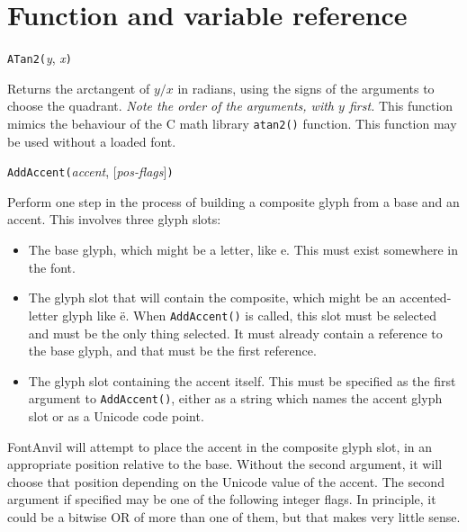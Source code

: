\chapter{Function and variable reference}



\texttt{ATan2(}\textit{y}, \textit{x}\texttt{)}

Returns the arctangent of $y/x$ in radians, using the signs of the arguments
to choose the quadrant.  \emph{Note the order of the arguments, with $y$
first.}  This function mimics the behaviour of the C math library
\texttt{atan2()} function.  This function may be used without a
loaded font.



\texttt{AddAccent(}\textit{accent}, [\textit{pos-flags}]\texttt{)}

Perform one step in the process of building a composite glyph from a base
and an accent.  This involves three glyph slots:
\begin{itemize}
  \item The base glyph, which might be a letter, like e.  This must exist
    somewhere in the font.
  \item The glyph slot that will contain the composite, which might be an
    accented-letter glyph like \"{e}.  When \texttt{AddAccent()} is called,
    this slot must be selected and must be the only thing selected.  It must
    already contain a reference to the base glyph, and that must be the
    first reference.
  \item The glyph slot containing the accent itself.  This must be specified
    as the first argument to \texttt{AddAccent()}, either as a string which
    names the accent glyph slot or as a Unicode code point.
\end{itemize}

FontAnvil will attempt to place the accent in the composite glyph slot, in
an appropriate position relative to the base.  Without the second argument,
it will choose that position depending on the Unicode value of the accent. 
The second argument if specified may be one of the
following integer flags.  In principle, it could be a bitwise OR of more than
one of them, but that makes very little sense.

